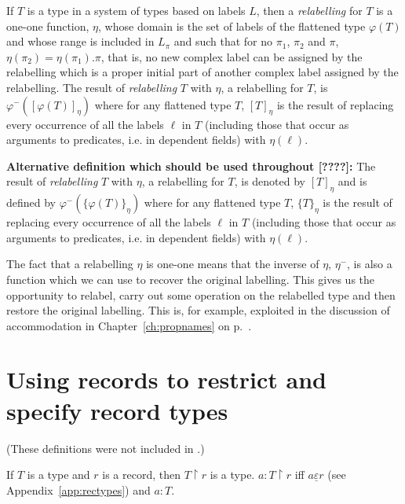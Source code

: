 If $T$ is a type in a system of types based on labels $L$, then a
\textit{relabelling} for $T$ is a one-one function,
$\eta$, whose domain is the set of labels of the flattened type
$\varphi(T)$ and whose range is included in $L_\pi$ and such that for
no $\pi_1$, $\pi_2$ and $\pi$, $\eta(\pi_2)=\eta(\pi_1).\pi$, that is,
no new complex label can be assigned by the relabelling which is a
proper initial part of another complex label assigned by the relabelling.  The result of
\textit{relabelling} $T$ with $\eta$, a relabelling for $T$, is $\varphi^-([\varphi(T)]_\eta)$
where for any flattened type $T$, $[T]_\eta$ is the result of replacing every
occurrence of all the labels $\ell$ in $T$ (including those that occur as arguments to predicates,
i.e. in dependent fields) with $\eta(\ell)$.

\textbf{Alternative definition which should be used throughout [????]:}  The result of
\textit{relabelling} $T$ with $\eta$, a relabelling for $T$, is
denoted by  $[T]_\eta$ and is defined by $\varphi^-(\{\varphi(T)\}_\eta)$
where for any flattened type $T$, $\{T\}_\eta$ is the result of replacing every
occurrence of all the labels $\ell$ in $T$ (including those that occur as arguments to predicates,
i.e. in dependent fields) with $\eta(\ell)$.

The fact that a relabelling $\eta$ is one-one means that the inverse
of $\eta$, $\eta^-$, is also a function which we can use to recover
the original labelling.  This gives us the opportunity to relabel,
carry out some operation on the relabelled type and then restore the
original labelling.  This is, for example, exploited in the discussion
of accommodation in Chapter~\ref{ch:propnames} on p.~\pageref{pg:inverserelabelling}.


\section{Using records to restrict and specify record types}
\label{app:specrec}

(These definitions were not included in \citealp{Cooper2012}.)

If $T$ is a type and $r$ is a record, then $T\!\restriction\!r$ is a
type. $a:T\!\restriction\!r$ iff $a\underline{\varepsilon} r$ (see
Appendix~\ref{app:rectypes}) and $a:T$.

